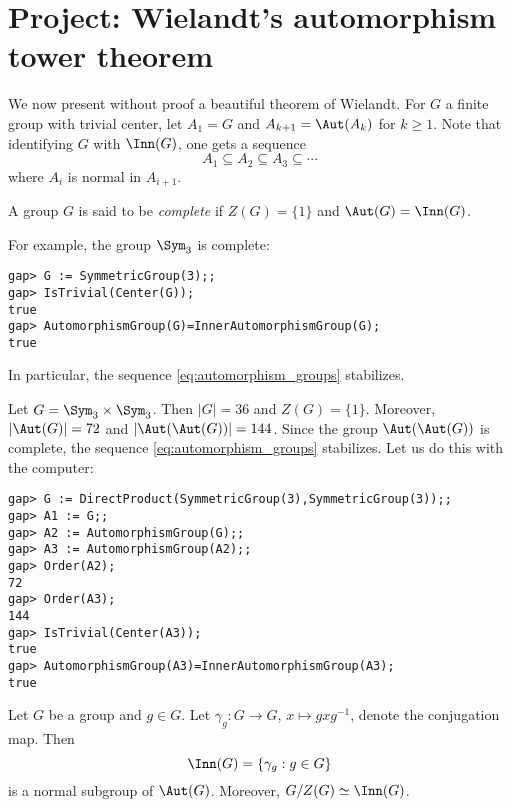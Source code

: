 \section{Project: Wielandt's automorphism tower theorem}

We now present without proof a beautiful theorem of Wielandt. 
For $G$ a finite group with trivial center, let 
$A_1=G$ and $A_{k+1}=\Aut(A_k)$ for $k\geq1$. Note that 
identifying $G$ with $\Inn(G)$, one gets a sequence
\begin{equation}
\label{eq:automorphism_groups}
A_1\subseteq A_2\subseteq A_3\subseteq\cdots 
\end{equation}
where $A_i$ is normal in $A_{i+1}$. 

\begin{definition}
    A group $G$ is said to be \emph{complete} if $Z(G)=\{1\}$ and
    $\Aut(G)=\Inn(G)$. 
\end{definition}

\begin{example}
For example, the group $\Sym_3$ is complete:
\begin{lstlisting}
gap> G := SymmetricGroup(3);;
gap> IsTrivial(Center(G));
true
gap> AutomorphismGroup(G)=InnerAutomorphismGroup(G);
true    
\end{lstlisting}
In particular, the sequence \eqref{eq:automorphism_groups}
stabilizes. 
\end{example}

\begin{example}
    Let $G=\Sym_3\times\Sym_3$. Then $|G|=36$ and $Z(G)=\{1\}$. Moreover, 
    $|\Aut(G)|=72$ and $|\Aut(\Aut(G))|=144$. Since the group
    $\Aut(\Aut(G))$ is complete, the sequence \eqref{eq:automorphism_groups} stabilizes. Let us do this 
    with the computer: 
\begin{lstlisting}
gap> G := DirectProduct(SymmetricGroup(3),SymmetricGroup(3));;
gap> A1 := G;;
gap> A2 := AutomorphismGroup(G);;
gap> A3 := AutomorphismGroup(A2);;
gap> Order(A2);
72
gap> Order(A3);
144
gap> IsTrivial(Center(A3));
true
gap> AutomorphismGroup(A3)=InnerAutomorphismGroup(A3);
true    
\end{lstlisting}
\end{example}

Let $G$ be a group and $g\in G$. Let
$\gamma_g\colon G\to G$, $x\mapsto gxg^{-1}$, denote the
conjugation map. Then 
\[
\Inn(G)=\{\gamma_g:g\in G\}
\]
is a normal subgroup of $\Aut(G)$. Moreover, $G/Z(G)\simeq\Inn(G)$. 

